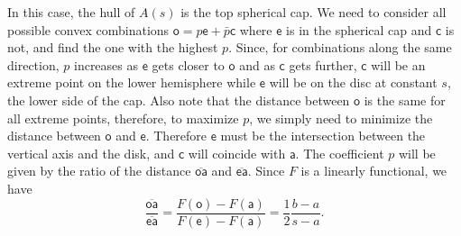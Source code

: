 \documentclass[10pt,twocolumn, nofootinbib]{revtex4-2}
\newcommand{\ens}[1][e] {\mathsf{#1}} %
\begin{document}
In this case, the hull of $A(s)$ is the top spherical cap. We need to consider all possible convex combinations $\ens[o] = p \ens + \bar{p} \ens[c]$ where $\ens$ is in the spherical cap and $\ens[c]$ is not, and find the one with the highest $p$. Since, for combinations along the same direction, $p$ increases as $\ens$ gets closer to $\ens[o]$ and as $\ens[c]$ gets further, $\ens[c]$ will be an extreme point on the lower hemisphere while $\ens$ will be on the disc at constant $s$, the lower side of the cap. Also note that the distance between $\ens[o]$ is the same for all extreme points, therefore, to maximize $p$, we simply need to minimize the distance between $\ens[o]$ and $\ens$. Therefore $\ens$ must be the intersection between the vertical axis and the disk, and $\ens[c]$ will coincide with $\ens[a]$. The coefficient $p$ will be given by the ratio of the distance $\overline{\ens[o]\ens[a]}$ and $\overline{\ens\ens[a]}$. Since $F$ is a linearly functional, we have
\begin{equation}
	\frac{\overline{\ens[o]\ens[a]}}{\overline{\ens\ens[a]}} = \frac{F(\ens[o])-F(\ens[a])}{F(\ens) - F(\ens[a])} = \frac{1}{2} \frac{b - a}{s-a}.
\end{equation}
\end{document}
